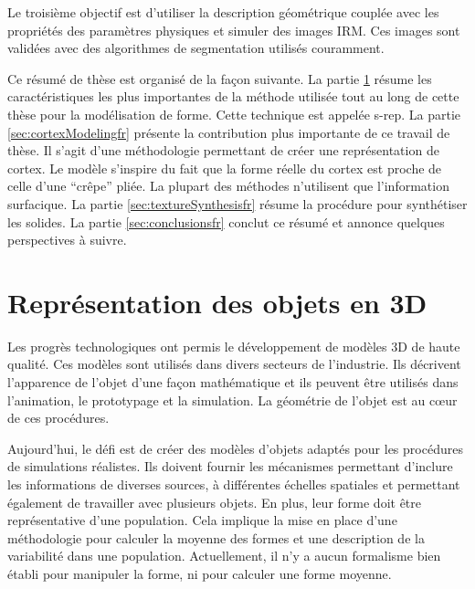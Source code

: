 Le troisième objectif est d'utiliser la description géométrique couplée avec les propriétés des paramètres physiques et simuler des images IRM.
Ces images sont validées avec des algorithmes de segmentation utilisés couramment.

Ce résumé de thèse est organisé de la façon suivante.  
La partie \ref{sec:3DModelsfr} résume les caractéristiques les plus importantes de la méthode utilisée tout au long de cette thèse pour la modélisation de forme. Cette technique est appelée s-rep. 
La partie \ref{sec:cortexModelingfr} présente la contribution plus importante de ce travail de thèse.  
Il s'agit d'une méthodologie permettant de créer une représentation de cortex. Le modèle s'inspire du fait que la forme réelle du cortex est proche de celle d'une ``crêpe'' pliée. 
La plupart des méthodes n'utilisent que l'information surfacique.
La partie \ref{sec:textureSynthesisfr} résume la procédure pour synthétiser les solides.
La partie \ref{sec:conclusionsfr} conclut ce résumé et annonce quelques perspectives à suivre.

\section{Représentation des objets en 3D}
\label{sec:3DModelsfr}

Les progrès technologiques ont permis le développement de modèles 3D de haute qualité. Ces modèles sont utilisés dans divers secteurs de l'industrie.
Ils décrivent l'apparence de l'objet d'une façon mathématique et ils peuvent être utilisés dans l'animation, le prototypage et la simulation.
La géométrie de l'objet est au cœur de ces procédures.

Aujourd'hui, le défi est de créer des modèles d'objets adaptés pour les procédures de simulations réalistes.
Ils doivent fournir les mécanismes permettant d'inclure les informations de diverses sources, à différentes échelles spatiales et permettant également de travailler avec plusieurs objets.
En plus, leur forme doit être représentative d'une population.
Cela implique la mise en place d'une méthodologie pour calculer la moyenne des formes et une description de la variabilité dans une population.
Actuellement, il n'y a aucun formalisme bien établi pour manipuler la forme, ni pour calculer une forme moyenne.


